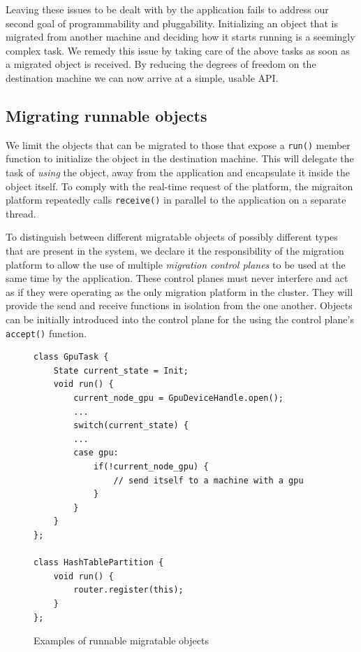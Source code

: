 Leaving these issues to be dealt with by the application
fails to address our second goal of programmability and pluggability.
Initializing an object that is migrated from another machine and deciding how
it starts running is a seemingly complex task.
We remedy this issue by taking care of the above tasks as soon as a migrated
object is received. By reducing the degrees of freedom on the destination
machine we can now arrive at a simple, usable API.

\subsection{Migrating runnable objects}
\label{subsec:runnable}
We limit the objects that can be migrated to those
that expose a \texttt{run()} member function to
initialize the object in the destination machine. This will delegate the task
of \emph{using} the object, away from the application and encapsulate it inside
the object itself. To comply with the real-time request of the platform,
the migraiton platform repeatedly calls \texttt{receive()} in parallel to the
application on a separate thread.

To distinguish between different migratable objects of possibly different
types that are present in the system, we declare it the responsibility of the
migration platform to allow the use of multiple
\emph{migration control planes} to be used at the same time by the
application. These control planes must never interfere and act as if they were
operating as the only migration platform in the cluster. They will provide
the send and receive functions in isolation from the one another.
Objects can be initially introduced into the control plane for the
using the control plane's \texttt{accept()} function.

\begin{figure}[tp]
\begin{lstlisting}
class GpuTask {
    State current_state = Init;
    void run() {
        current_node_gpu = GpuDeviceHandle.open();
        ...
        switch(current_state) {
        ...
        case gpu:
            if(!current_node_gpu) {
                // send itself to a machine with a gpu
            }
        }
    }
};

class HashTablePartition {
    void run() {
        router.register(this);
    }
};
\end{lstlisting}
\caption{
    Examples of runnable migratable objects
}
\label{fig:sketchclasses}
\end{figure}

